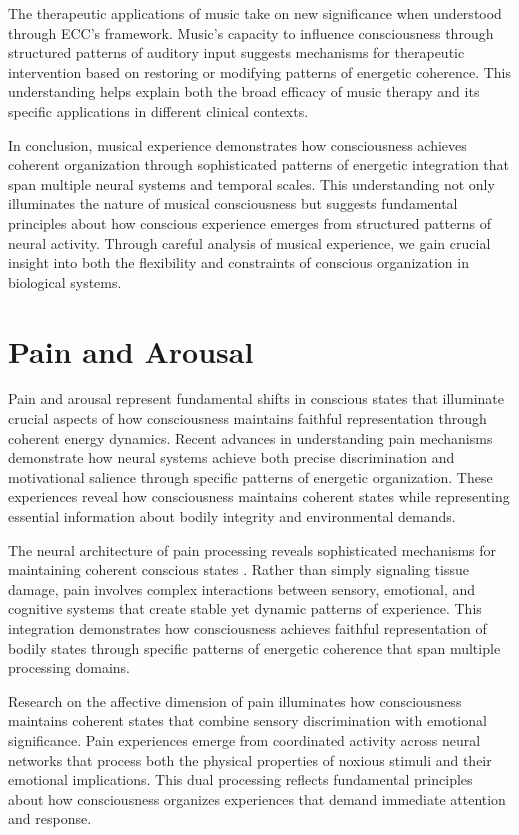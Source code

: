 \begin{refsection}
The therapeutic applications of music \cite{Schaefer2014} take on new significance when understood through ECC's framework. Music's capacity to influence consciousness through structured patterns of auditory input suggests mechanisms for therapeutic intervention based on restoring or modifying patterns of energetic coherence. This understanding helps explain both the broad efficacy of music therapy and its specific applications in different clinical contexts.

In conclusion, musical experience demonstrates how consciousness achieves coherent organization through sophisticated patterns of energetic integration that span multiple neural systems and temporal scales. This understanding not only illuminates the nature of musical consciousness but suggests fundamental principles about how conscious experience emerges from structured patterns of neural activity. Through careful analysis of musical experience, we gain crucial insight into both the flexibility and constraints of conscious organization in biological systems.

\section{Pain and Arousal}

Pain and arousal represent fundamental shifts in conscious states that illuminate crucial aspects of how consciousness maintains faithful representation through coherent energy dynamics. Recent advances in understanding pain mechanisms \cite{Apkarian2005} demonstrate how neural systems achieve both precise discrimination and motivational salience through specific patterns of energetic organization. These experiences reveal how consciousness maintains coherent states while representing essential information about bodily integrity and environmental demands.

The neural architecture of pain processing reveals sophisticated mechanisms for maintaining coherent conscious states \cite{Tracey2007}. Rather than simply signaling tissue damage, pain involves complex interactions between sensory, emotional, and cognitive systems that create stable yet dynamic patterns of experience. This integration demonstrates how consciousness achieves faithful representation of bodily states through specific patterns of energetic coherence that span multiple processing domains.

Research on the affective dimension of pain \cite{Price2000} illuminates how consciousness maintains coherent states that combine sensory discrimination with emotional significance. Pain experiences emerge from coordinated activity across neural networks that process both the physical properties of noxious stimuli and their emotional implications. This dual processing reflects fundamental principles about how consciousness organizes experiences that demand immediate attention and response.


\end{refsection}
